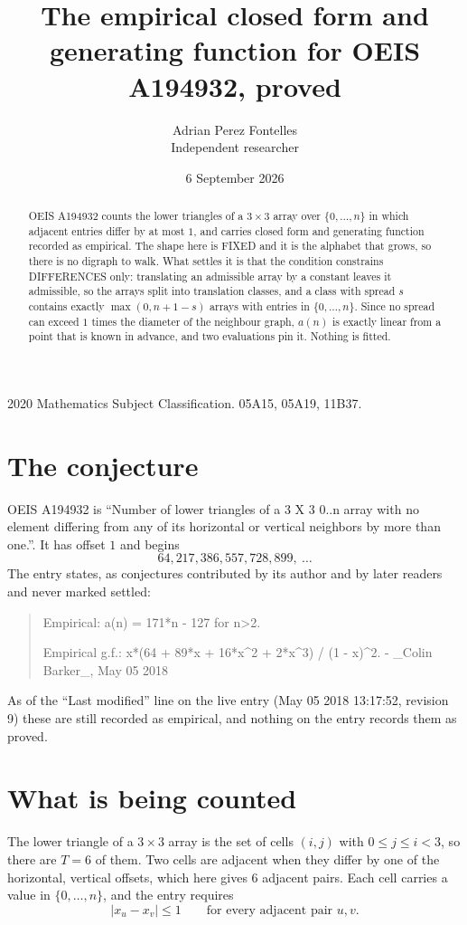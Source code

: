 \documentclass[11pt,a4paper]{article}
\title{The empirical closed form and generating function for OEIS A194932, proved}
\author{Adrian Perez Fontelles\\ \small Independent researcher}
\date{6 September 2026}
\theoremstyle{plain}
\theoremstyle{definition}
\begin{document}
\maketitle

\begin{abstract}
OEIS A194932 counts the lower triangles of a $3\times3$ array over $\{0,\dots,n\}$ in which
adjacent entries differ by at most $1$, and carries closed form and generating function recorded as empirical. The shape here is FIXED
and it is the alphabet that grows, so there is no digraph to walk. What settles it is that the
condition constrains DIFFERENCES only: translating an admissible array by a constant leaves it
admissible, so the arrays split into translation classes, and a class with spread $s$ contains
exactly $\max(0,n+1-s)$ arrays with entries in $\{0,\dots,n\}$. Since no spread can exceed
$1$ times the diameter of the neighbour graph, $a(n)$ is exactly linear from a point that is
known in advance, and two evaluations pin it. Nothing is fitted.
\end{abstract}

\noindent\small 2020 Mathematics Subject Classification. 05A15, 05A19, 11B37.\normalsize

\section{The conjecture}

OEIS A194932 is ``Number of lower triangles of a 3 X 3 0..n array with no element differing from any of its horizontal or vertical neighbors by more than one.''. It has offset $1$ and begins
\[
64, 217, 386, 557, 728, 899,\ \dots
\]
The entry states, as conjectures contributed by its author and by later readers and never
marked settled:
\begin{quote}
Empirical: a(n) = 171*n - 127 for n>2.

Empirical g.f.: x*(64 + 89*x + 16*x\^{}2 + 2*x\^{}3) / (1 - x)\^{}2. - \_Colin Barker\_, May 05 2018
\end{quote}
As of the ``Last modified'' line on the live entry (May 05 2018 13:17:52, revision 9) these are still
recorded as empirical, and nothing on the entry records them as proved.

\section{What is being counted}

The lower triangle of a $3\times3$ array is the set of cells $(i,j)$ with $0\le j\le
i<3$, so there are $T=6$ of them. Two cells are adjacent when they differ by one of the
horizontal, vertical offsets, which here gives $6$ adjacent pairs. Each cell carries a value in
$\{0,\dots,n\}$, and the entry requires
\[
|x_u-x_v|\le 1\qquad\text{for every adjacent pair }u,v .
\]
\end{document}
